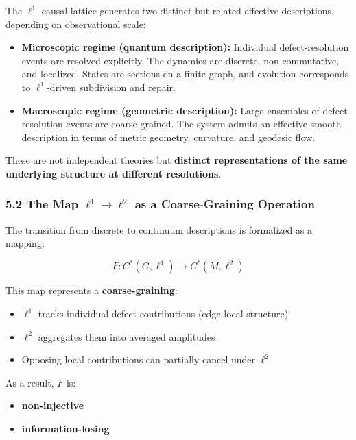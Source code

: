 \documentclass[
]{article}
\providecommand{\tightlist}{%
  \setlength{\itemsep}{0pt}\setlength{\parskip}{0pt}}
\begin{document}
The \(\ell^1\) causal lattice generates two distinct but related
effective descriptions, depending on observational scale:

\begin{itemize}
\item
  \textbf{Microscopic regime (quantum description):} Individual
  defect-resolution events are resolved explicitly. The dynamics are
  discrete, non-commutative, and localized. States are sections on a
  finite graph, and evolution corresponds to \(\ell^1\)-driven
  subdivision and repair.
\item
  \textbf{Macroscopic regime (geometric description):} Large ensembles
  of defect-resolution events are coarse-grained. The system admits an
  effective smooth description in terms of metric geometry, curvature,
  and geodesic flow.
\end{itemize}

These are not independent theories but \textbf{distinct representations
of the same underlying structure at different resolutions}.

\hypertarget{the-map-ell1-to-ell2-as-a-coarse-graining-operation}{%
\subsubsection{\texorpdfstring{5.2 The Map \(\ell^1 \to \ell^2\) as a
Coarse-Graining
Operation}{5.2 The Map \textbackslash ell\^{}1 \textbackslash to \textbackslash ell\^{}2 as a Coarse-Graining Operation}}\label{the-map-ell1-to-ell2-as-a-coarse-graining-operation}}

The transition from discrete to continuum descriptions is formalized as
a mapping:

\[F: C^*(G, \ell^1) \to C^*(M, \ell^2)\]

This map represents a \textbf{coarse-graining}:

\begin{itemize}
\tightlist
\item
  \(\ell^1\) tracks individual defect contributions (edge-local
  structure)
\item
  \(\ell^2\) aggregates them into averaged amplitudes
\item
  Opposing local contributions can partially cancel under \(\ell^2\)
\end{itemize}

As a result, \(F\) is:

\begin{itemize}
\tightlist
\item
  \textbf{non-injective}
\item
  \textbf{information-losing}
\end{itemize}
\end{document}
